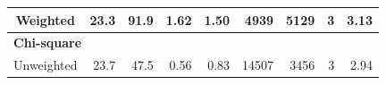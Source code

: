 \documentclass[a4paper,fleqn]{cas-sc}
\begin{document}
\begin{table}[]
\begin{tabular}{crrrrrrrr}
Weighted                                                                                                   & 23.3                                                                                   & 91.9                                                                                        & 1.62                                                                            & 1.50                                                                                          & 4939                                                                                      & 5129                                                                                               & 3                                                                                       & 3.13                                                                                   \\ \hline
\multicolumn{9}{l}{\textbf{Chi-square}}                                                                                                                                                                                                                                                                                                                                                                                                                                                                                                                                                                                                                                                                                                                                                                                                                                 \\
Unweighted                                                                                                 & 23.7                                                                                   & 47.5                                                                                        & 0.56                                                                            & 0.83                                                                                          & 14507                                                                                     & 3456                                                                                               & 3                                                                                       & 2.94                                                                                   \\

\end{tabular}
\end{table}
\end{document}
